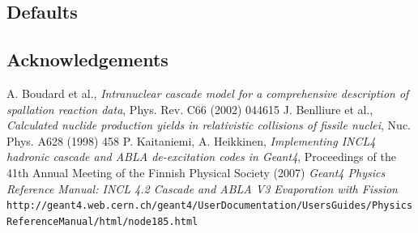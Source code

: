 \documentclass[20pt]{article}
\newenvironment{textbox}
{\begin{lrbox}{\dummybox}\begin{minipage}{0.9\columnwidth}}
{\end{minipage}\end{lrbox}\raisebox{-\depth}{\psshadowbox[framesep=1em,framearc=.1,shadow=true]{\usebox{\dummybox}}}\vspace{0.005\textheight}}
\begin{document}
\begin{center}
\begin{multicols}{3}
\begin{textbox}
\end{textbox}
\begin{textbox}


\section*{\color{udsect} Defaults}
 
 
\end{textbox}
\begin{textbox}


\section*{\color{udsect} Acknowledgements}



\end{textbox}
\begin{textbox}

{\small
{}
\begin{thebibliography}{9}
 A. Boudard et al., \emph{Intranuclear cascade model for
    a comprehensive description of spallation reaction data}, Phys.
  Rev. C66 (2002) 044615
 J. Benlliure et al., \emph{Calculated nuclide
    production yields in relativistic collisions of fissile nuclei},
  Nuc. Phys. A628 (1998) 458
 P. Kaitaniemi, A. Heikkinen, \emph{Implementing INCL4
    hadronic cascade and ABLA de-excitation codes in Geant4},
  Proceedings of the 41th Annual Meeting of the Finnish Physical
  Society (2007)
 \emph{Geant4 Physics Reference Manual: INCL 4.2 Cascade and ABLA V3 Evaporation with Fission} {\tt http://geant4.web.cern.ch/\-geant4/\-UserDocumentation/\-UsersGuides/\-PhysicsReferenceManual/\-html/\-node185.html}
%
%
\end{thebibliography}
}

\end{textbox}

\end{multicols}

\end{center}
\end{document}
